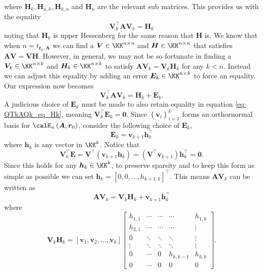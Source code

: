 where $\bm{H}_k , \bm{H}_{u,k}, \bm{H}_{k,u}$ and $\bm{H}_u$ are the relevant sub matrices. This provides us with the equality
\begin{equation}\label{eq: QTkAQk_eq_Hk}
    \bm{V}_{k}^{\intercal} \bm{A} \bm{V}_{k} = \bm{H}_k
\end{equation}
noting that $\bm{H}_{k}$ is upper Hessenberg for the same reason that $\bm{H}$ is. We know that when $n = t_{\bm{r}_0, \bm{A}}$ we can find a $\bm{V} \in \KK^{n \times n}$ and $\bm{H} \in \KK^{n \times n}$ that satisfies $\bm{A} \bm{V} = \bm{V} \bm{H}$. However, in general, we may not be so fortunate in finding a $\bm{V}_{k} \in \KK^{n \times k}$ and $\bm{H}_{k} \in \KK^{n \times k}$ to satisfy $\bm{A} \bm{V}_{k} = \bm{V}_{k} \bm{H}_k$ for any $k < n$. Instead we can adjust this equality by adding an error $\bm{E}_k \in \KK^{n \times k}$ to force an equality. Our expression now becomes
\begin{equation}\label{eq: QTkAQk_eq_HkEk}
    \bm{V}_{k}^{\intercal} \bm{A} \bm{V}_{k} = \bm{H}_k + \bm{E}_k.
\end{equation}
A judicious choice of $\bm{E}_k$ must be made to also retain equality in equation \ref{eq: QTkAQk_eq_Hk}, meaning $\bm{V}_{k}^{\intercal} \bm{E}_k = \bm{0}$. Since $\left\{ \bm{v}_i \right\}_{i=1}^{k}$ forms an orthornormal basis for $\calK_{n} \left( \bm{A}, \bm{r}_0 \right)$, consider the following choice of $\bm{E}_k$,
\[
    \bm{E}_k = \bm{v}_{k+1} \bm{h}_{k}^{\intercal}
\]
where $\bm{h}_k$ is any vector in $\KK^{k}$. Notice that
\[
    \bm{V}_{k}^{\intercal} \bm{E} = \bm{V}^{\intercal} \left( \bm{v}_{k+1} \bm{h}_k \right) = \left( \bm{V}^{\intercal} \bm{v}_{k+1} \right) \bm{h}_{k}^{\intercal} = \bm{0}.
\]
Since this holds for any $\bm{h}_k \in \KK^{k}$, to preserve sparsity and to keep this form as simple as possible we can set $\bm{h}_k = \left[ 0,0, \ldots , h_{k+1,k} \right]^{\intercal}$. This means $\bm{A} \bm{V}_k$ can be written as
\begin{equation}\label{eq: QTkAQk_eq_Hk_p_qkhk}
    \bm{A} \bm{V}_k =  \bm{V}_k \bm{H}_k + \bm{v}_{k+1} \bm{h}_{k}^{\intercal}
\end{equation}
where
\[
    \bm{V}_k \bm{H}_k =
    \left[ \bm{v}_1 , \bm{v}_2 , \ldots , \bm{v}_k \right]
    \begin{bmatrix}
        h_{1,1} & \cdots & \cdots & \cdots    & h_{1,k} \\
        h_{2,1} & \cdots & \cdots & \cdots    & \vdots  \\
        0       & \ddots & \ddots & \ddots    & \vdots  \\
        \vdots  & \ddots & \ddots & \ddots    & \vdots  \\
        0       & \cdots & 0      & h_{k,k-1} & h_{k,k} \\
        0       & \cdots & 0      & 0         & 0
    \end{bmatrix}.
\]
